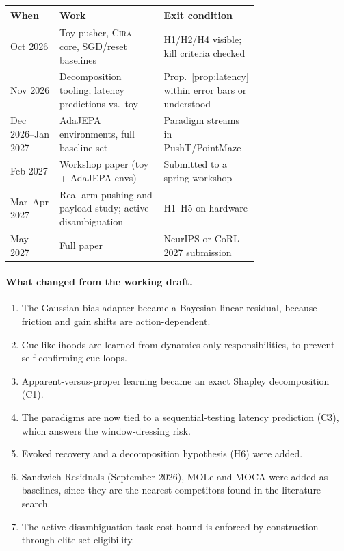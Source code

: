 \documentclass[10pt]{article}
\newcommand{\method}{\textsc{Cira}}
\begin{document}
\begin{center}
\small
\begin{tabular}{lp{0.42\linewidth}p{0.3\linewidth}}
\toprule
When & Work & Exit condition \\
\midrule
Oct 2026 & Toy pusher, \method{} core, SGD/reset baselines & H1/H2/H4 visible; kill criteria checked \\
Nov 2026 & Decomposition tooling; latency predictions vs.\ toy & Prop.~\ref{prop:latency} within error bars or understood \\
Dec 2026--Jan 2027 & AdaJEPA environments, full baseline set & Paradigm streams in PushT/PointMaze \\
Feb 2027 & Workshop paper (toy + AdaJEPA envs) & Submitted to a spring workshop \\
Mar--Apr 2027 & Real-arm pushing and payload study; active disambiguation & H1--H5 on hardware \\
May 2027 & Full paper & NeurIPS or CoRL 2027 submission \\
\bottomrule
\end{tabular}
\end{center}

\paragraph{What changed from the working draft.}
\begin{enumerate}
  \item The Gaussian bias adapter became a Bayesian linear residual, because friction and gain shifts are
  action-dependent.
  \item Cue likelihoods are learned from dynamics-only responsibilities, to prevent self-confirming cue
  loops.
  \item Apparent-versus-proper learning became an exact Shapley decomposition (C1).
  \item The paradigms are now tied to a sequential-testing latency prediction (C3), which answers the
  window-dressing risk.
  \item Evoked recovery and a decomposition hypothesis (H6) were added.
  \item Sandwich-Residuals (September 2026), MOLe and MOCA were added as baselines, since they are the
  nearest competitors found in the literature search.
  \item The active-disambiguation task-cost bound is enforced by construction through elite-set
  eligibility.
\end{enumerate}

\begingroup
\small
\setlength{\bibsep}{1pt}


\endgroup
\end{document}
